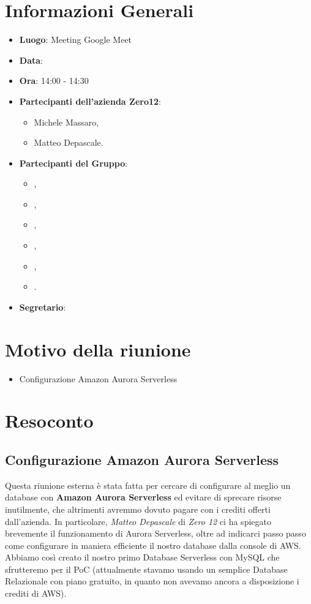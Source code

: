 \section{Informazioni Generali}

\begin{itemize}
\item{\textbf{Luogo}}: Meeting Google Meet
\item{\textbf{Data}}: \D{}
\item{\textbf{Ora}}: 14:00 - 14:30
\item{\textbf{Partecipanti dell'azienda Zero12}}: 
	\begin{itemize}
	\item{Michele Massaro,} 
	\item{Matteo Depascale.}
	\end{itemize} 
\item{\textbf{Partecipanti del Gruppo}}: 
	\begin{itemize}
	\item{\EP{},} 
	\item{\FP{},}
	\item{\GC{},}
	\item{\LW{},}	
	\item{\MB{},}
	\item{\PV{}.}
	\end{itemize} 
\item{\textbf{Segretario}}: \GC{}
\end{itemize}

\section{Motivo della riunione}
\begin{itemize}
\item{Configurazione Amazon Aurora Serverless}
\end{itemize}

\section{Resoconto}

\subsection{Configurazione Amazon Aurora Serverless}

Questa riunione esterna è stata fatta per cercare di configurare al meglio un database con \textbf{Amazon Aurora Serverless} ed evitare di sprecare risorse inutilmente, che altrimenti avremmo dovuto pagare con i crediti offerti dall'azienda. In particolare, \textit{Matteo Depascale} di \textit{Zero 12} ci ha spiegato brevemente il funzionamento di Aurora Serverless, oltre ad indicarci passo passo come configurare in maniera efficiente il nostro database dalla console di AWS. Abbiamo così creato il nostro primo Database Serverless con MySQL che sfrutteremo per il PoC (attualmente stavamo usando un semplice Database Relazionale con piano gratuito, in quanto non avevamo ancora a disposizione i crediti di AWS). \\

